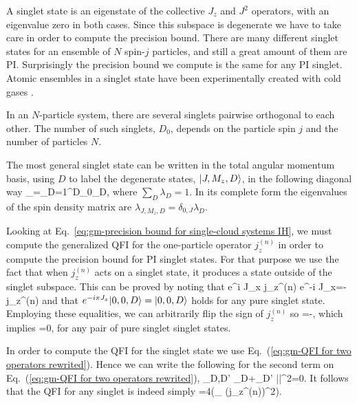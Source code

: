 A singlet state is an eigenstate of the collective $J_z$ and $J^2$
operators, with an eigenvalue zero in both cases.
Since this subspace is degenerate we have to take care in order to compute the
precision bound. There are many different singlet states for an ensemble of $N$
spin-$j$ particles, and still a great amount of them are PI.
Surprisingly the precision bound we compute is the same
for any PI singlet. Atomic ensembles in a singlet state have been experimentally
created with cold gases \cite{Toth2010,Behbood2014}.

In an $N$-particle system, there are several singlets pairwise orthogonal to each other. The number of such singlets, $D_0$, depends on the particle spin $j$ and the number of particles $N$.

The most general singlet state can be written in the total angular momentum basis, using $D$ to label the degenerate states, $\vert{J,M_z,D}\rangle$, in the following diagonal way
\be
\rho_{}=\sum_{D=1}^{D_0}\lambda_D,
\label{eq:gm-definition of a general singlet}
\ee
where $\sum_D \lambda_D=1$.
In its complete form the eigenvalues of the spin density matrix are $\lambda_{J,M_z,D}=\delta_{0,J}\lambda_D$.

Looking at Eq.~\eqref{eq:gm-precision bound for single-cloud systems IH},
we must compute the generalized QFI for the one-particle operator $j_z^{(n)}$
in order to compute the precision bound for PI singlet states.
For that purpose we use the fact that when $j_z^{(n)}$ acts on a
singlet state, it produces a state outside of the singlet subspace.
This can be proved by noting that
\be
e^{i \pi J_x} j_z^{(n)} e^{-i \pi
J_x}=-j_z^{(n)}
\ee
and that $e^{-i\pi J_x} \vert{0,0,D}\rangle = \vert{0,0,D}\rangle$
holds for any pure singlet state.
Employing these equalities, we can arbitrarily flip the sign of $j_z^{(n)}$ so
\be
{}
=-,
\ee
which implies
\be
\label{eq:gm-jzn in subspace of singlets is a null operator}
=0,
\ee
for any pair of pure singlet singlet states.

In order to compute the QFI for the singlet state we use
Eq.~(\ref{eq:gm-QFI for two operators rewrited}). Hence we can write the
following for the second term on Eq.~(\ref{eq:gm-QFI for two operators rewrited}),
\sum_{D,D'}
{\lambda_D+\lambda_{D'}}
||^2=0.
\ee
It follows that the QFI for any singlet is indeed simply
\be
\label{eq:gm-qfi to trace in the case of singlet}
=4\tr({\rho_{} (j_z^{(n)})^2}).
\ee

